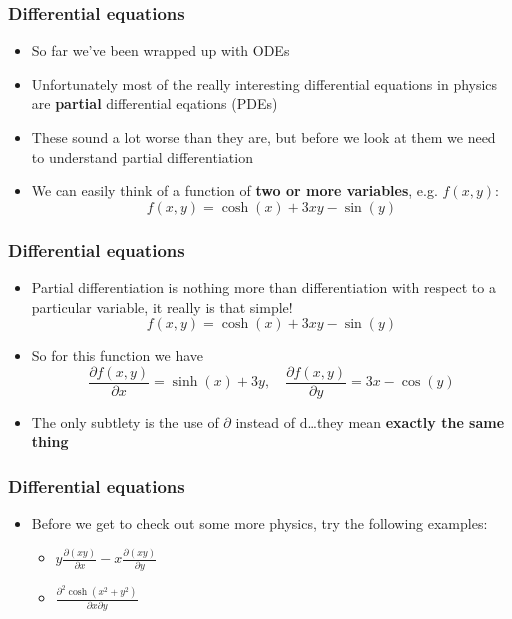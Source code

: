 \documentclass{beamer}
\begin{document}
\begin{frame}
  \frametitle{Differential equations}
  \begin{itemize}
    \item<1-> So far we've been wrapped up with ODEs
    \item<2-> Unfortunately most of the really interesting differential equations in physics are \textbf{partial} differential eqations (PDEs)
    \item<3-> These sound a lot worse than they are, but before we look at them we need to understand partial differentiation
    \item<4-> We can easily think of a function of \textbf{two or more variables}, e.g. $f(x,y)$:
      \begin{equation*}
	f(x,y)=\cosh(x)+3xy-\sin(y)
      \end{equation*}
  \end{itemize}
\end{frame}

\begin{frame}
  \frametitle{Differential equations}
  \begin{itemize}
    \item<1-> Partial differentiation is nothing more than differentiation with respect to a particular variable, it really is that simple!
      \begin{equation*}
	f(x,y)=\cosh(x)+3xy-\sin(y)
      \end{equation*}
    \item<2-> So for this function we have
      \begin{equation*}
	\frac{\partial f(x,y)}{\partial x}=\sinh(x)+3y, \quad \frac{\partial f(x,y)}{\partial y}=3x-\cos(y)
	\label{<+label+>}
      \end{equation*}
    \item<3-> The only subtlety is the use of $\partial$ instead of $\mathrm{d}$\ldots they mean \textbf{exactly the same thing}
  \end{itemize}
\end{frame}

\begin{frame}
  \frametitle{Differential equations}
  \begin{itemize}
    \item<1-> Before we get to check out some more physics, try the following examples:
      \begin{itemize}
	\item<2-> $y\frac{\partial (xy)}{\partial x}-x\frac{\partial (xy)}{\partial y}$
	\item<3-> $\frac{\partial^2 \cosh(x^2+y^2)}{\partial x\partial y}$
      \end{itemize}
  \end{itemize}
\end{frame}
\end{document}
